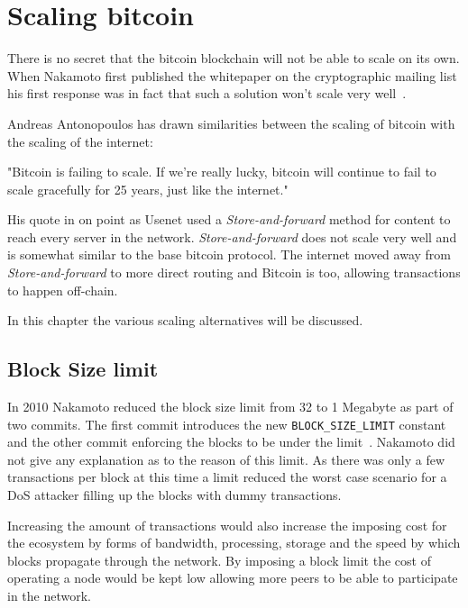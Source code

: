 \chapter{Scaling bitcoin}

There is no secret that the bitcoin blockchain will not be able to scale on its own. When Nakamoto first published the whitepaper on the cryptographic mailing list his first response was in fact that such a solution won't scale very well~\cite{donald:scale}. 

Andreas Antonopoulos has drawn similarities between the scaling of bitcoin with the scaling of the internet:

\begin{displayquote}
	"Bitcoin is failing to scale. If we’re really lucky, bitcoin will continue to fail to scale gracefully for 25 years, just like the internet."~\cite{antonopoulos:the:internet:of:money}
\end{displayquote}

His quote in on point as Usenet used a \textit{Store-and-forward} method for content to reach every server in the network. \textit{Store-and-forward} does not scale very well and is somewhat similar to the base \gls{bitcoin} protocol. The internet moved away from \textit{Store-and-forward} to more direct routing and Bitcoin is too, allowing transactions to happen off-chain.

In this chapter the various scaling alternatives will be discussed.

\section{Block Size limit}

In 2010 Nakamoto reduced the block size limit from 32 to 1 Megabyte as part of two commits. The first commit introduces the new \texttt{BLOCK\_SIZE\_LIMIT} constant~\cite{nakamoto:commit:1} and the other commit enforcing the blocks to be under the limit~\cite{nakamoto:commit:2}. Nakamoto did not give any explanation as to the reason of this limit. As there was only a few transactions per block at this time a limit reduced the worst case scenario for a DoS attacker filling up the blocks with dummy transactions. 

Increasing the amount of transactions would also increase the imposing cost for the ecosystem by forms of bandwidth, processing, storage and the speed by which blocks propagate through the network. By imposing a block limit the cost of operating a node would be kept low allowing more peers to be able to participate in the network. 

